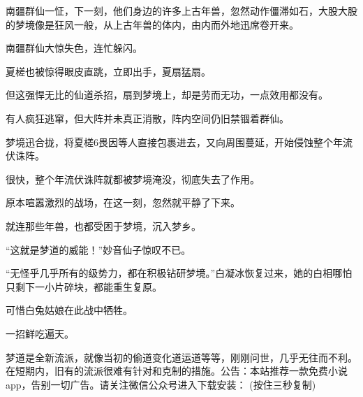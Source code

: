 \begin{this_body}
南疆群仙一怔，下一刻，他们身边的许多上古年兽，忽然动作僵滞如石，大股大股的梦境像是狂风一般，从上古年兽的体内，由内而外地迅席卷开来。

南疆群仙大惊失色，连忙躲闪。

夏槎也被惊得眼皮直跳，立即出手，夏扇猛扇。

但这强悍无比的仙道杀招，扇到梦境上，却是劳而无功，一点效用都没有。

有人疯狂逃窜，但大阵并未真正消散，阵内空间仍旧禁锢着群仙。

梦境迅合拢，将夏槎6畏因等人直接包裹进去，又向周围蔓延，开始侵蚀整个年流伏诛阵。

很快，整个年流伏诛阵就都被梦境淹没，彻底失去了作用。

原本喧嚣激烈的战场，在这一刻，忽然就平静了下来。

就连那些年兽，也都受困于梦境，沉入梦乡。

“这就是梦道的威能！”妙音仙子惊叹不已。

“无怪乎几乎所有的级势力，都在积极钻研梦境。”白凝冰恢复过来，她的白相哪怕只剩下一小片碎块，都能重生复原。

可惜白兔姑娘在此战中牺牲。

一招鲜吃遍天。

梦道是全新流派，就像当初的偷道变化道运道等等，刚刚问世，几乎无往而不利。在短期内，旧有的流派很难有针对和克制的措施。公告：本站推荐一款免费小说app，告别一切广告。请关注微信公众号进入下载安装： (按住三秒复制)

\end{this_body}

